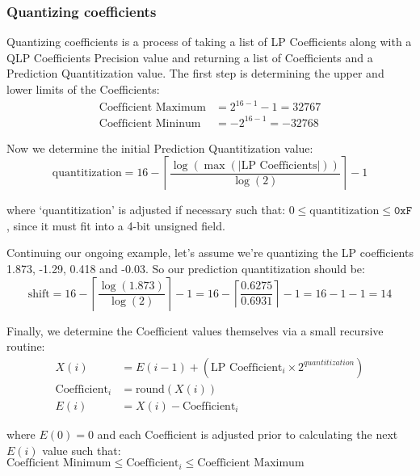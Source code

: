 \subsubsection{Quantizing coefficients}

Quantizing coefficients is a process of taking a list of LP Coefficients
along with a QLP Coefficients Precision value and
returning a list of Coefficients and a Prediction Quantitization value.
The first step is determining the upper and lower limits of the
Coefficients:
\begin{align}
\text{Coefficient Maximum} &= 2 ^ {16 - 1} - 1 = 32767\\
\text{Coefficient Mininum} &= - 2 ^ {16 - 1} = -32768
\end{align}
\par
\noindent
Now we determine the initial Prediction Quantitization value:
\begin{equation}
\text{quantitization} = 16 - \left \lceil \frac{\log(\max(|\text{LP Coefficients}|))}{\log(2) } \right \rceil - 1
\end{equation}
\par
\noindent
where `quantitization' is adjusted if necessary such that:
$0 \leq \text{quantitization} \leq \texttt{0xF}$
, since it must fit into a 4-bit unsigned field.

Continuing our ongoing example, let's assume we're quantizing the LP
coefficients 1.873, -1.29, 0.418 and -0.03.
So our prediction quantitization should be:
\begin{equation*}
\text{shift} = 16 - \left \lceil \frac{\log(1.873)}{\log(2)} \right \rceil - 1
= 16 - \left \lceil \frac{0.6275}{0.6931} \right \rceil - 1 = 16 - 1 - 1 = 14
\end{equation*}
\par
\noindent
Finally, we determine the Coefficient values themselves via a small
recursive routine:
\begin{align}
X(i) &= E(i - 1) + (\text{LP Coefficient}_i \times 2 ^ {quantitization}) \\
\text{Coefficient}_i &= \text{round}(X(i)) \\
E(i) &= X(i) - \text{Coefficient}_i
\end{align}
\par
\noindent
where $E(0) = 0$ and each Coefficient is adjusted
prior to calculating the next $E(i)$ value such that:
$\text{Coefficient Minimum} \leq \text{Coefficient}_i \leq \text{Coefficient Maximum}$

